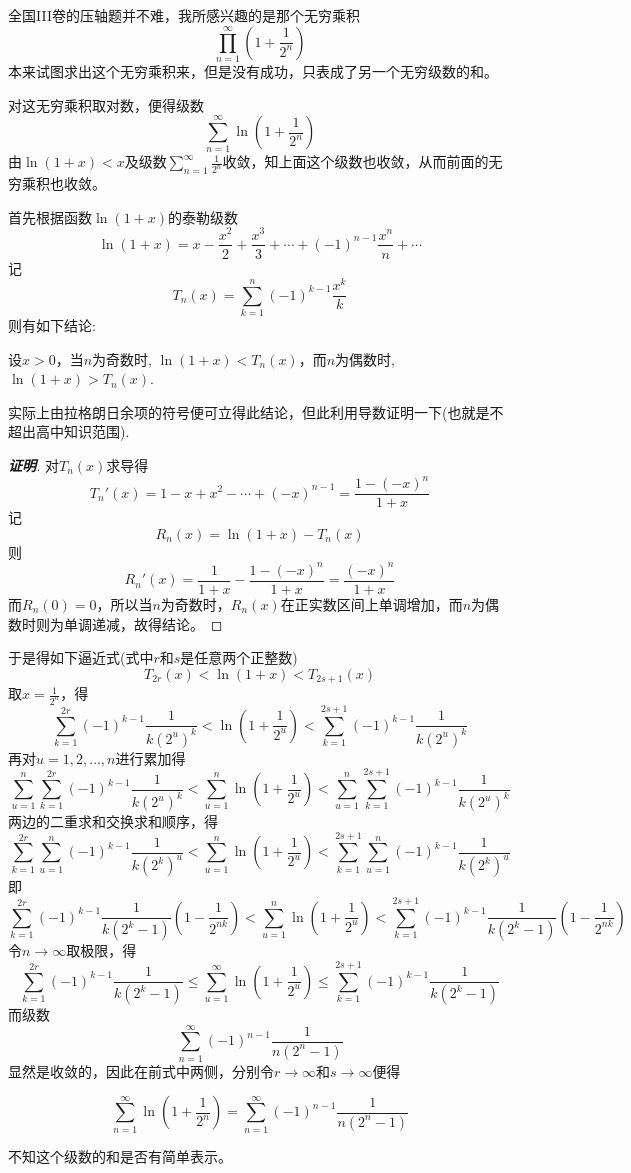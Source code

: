 \documentclass{ctexart}
\begin{document}
全国III卷的压轴题并不难，我所感兴趣的是那个无穷乘积
\[ \prod_{n=1}^{\infty}\left( 1+\frac{1}{2^n} \right) \]
本来试图求出这个无穷乘积来，但是没有成功，只表成了另一个无穷级数的和。

对这无穷乘积取对数，便得级数
\[ \sum_{n=1}^{\infty} \ln{ \left( 1+\frac{1}{2^n} \right) } \]
由$\ln(1+x)<x$及级数$\sum_{n=1}^{\infty} \frac{1}{2^n}$收敛，知上面这个级数也收敛，从而前面的无穷乘积也收敛。

首先根据函数$\ln{(1+x)}$的泰勒级数
\[ \ln{(1+x)} = x-\frac{x^2}{2}+\frac{x^3}{3}+\cdots + (-1)^{n-1} \frac{x^n}{n}  + \cdots \]
记
\[ T_n(x) = \sum_{k=1}^n (-1)^{k-1}\frac{x^k}{k} \]
则有如下结论:
\begin{statement}
  设$x>0$，当$n$为奇数时, $\ln{(1+x)} < T_n(x)$，而$n$为偶数时, $\ln{(1+x)}>T_n(x)$.
\end{statement}
实际上由拉格朗日余项的符号便可立得此结论，但此利用导数证明一下(也就是不超出高中知识范围).
\begin{proof}[\textbf{证明}]
  对$T_n(x)$求导得
  \[ T_n'(x) = 1-x+x^2-\cdots + (-x)^{n-1} = \frac{1-(-x)^n}{1+x} \]
  记
  \[ R_n(x) = \ln{(1+x)}-T_n(x) \]
  则
  \[ R_n'(x) = \frac{1}{1+x} - \frac{1-(-x)^n}{1+x} = \frac{(-x)^n}{1+x} \]
  而$R_n(0)=0$，所以当$n$为奇数时，$R_n(x)$在正实数区间上单调增加，而$n$为偶数时则为单调递减，故得结论。
\end{proof}

于是得如下逼近式(式中$r$和$s$是任意两个正整数)
\[ T_{2r}(x) < \ln{(1+x)} < T_{2s+1}(x) \]
取$x=\frac{1}{2^u}$，得
\[ \sum_{k=1}^{2r} (-1)^{k-1} \frac{1}{k(2^u)^k} < \ln{\left( 1+\frac{1}{2^u} \right) < \sum_{k=1}^{2s+1} (-1)^{k-1} \frac{1}{k(2^u)^k}} \]
再对$u=1,2,\ldots,n$进行累加得
\[ \sum_{u=1}^n \sum_{k=1}^{2r} (-1)^{k-1} \frac{1}{k(2^u)^k} < \sum_{u=1}^n \ln{\left( 1+\frac{1}{2^u} \right) < \sum_{u=1}^{n} \sum_{k=1}^{2s+1} (-1)^{k-1} \frac{1}{k(2^u)^k}} \]
两边的二重求和交换求和顺序，得
\[  \sum_{k=1}^{2r} \sum_{u=1}^n (-1)^{k-1} \frac{1}{k(2^k)^u} < \sum_{u=1}^n \ln{\left( 1+\frac{1}{2^u} \right) <  \sum_{k=1}^{2s+1} \sum_{u=1}^{n}(-1)^{k-1} \frac{1}{k(2^k)^u}} \]
即
\[ \sum_{k=1}^{2r} (-1)^{k-1} \frac{1}{k(2^k-1)} \left( 1-\frac{1}{2^{nk}} \right) < \sum_{u=1}^n \ln{\left( 1+\frac{1}{2^u} \right)} < \sum_{k=1}^{2s+1} (-1)^{k-1} \frac{1}{k(2^k-1)} \left( 1-\frac{1}{2^{nk}} \right)\]
令$n\to\infty$取极限，得
\[ \sum_{k=1}^{2r} (-1)^{k-1} \frac{1}{k(2^k-1)} \leqslant \sum_{u=1}^{\infty} \ln{\left( 1+\frac{1}{2^u} \right)} \leqslant \sum_{k=1}^{2s+1} (-1)^{k-1} \frac{1}{k(2^k-1)} \]
而级数
\[ \sum_{n=1}^{\infty} (-1)^{n-1} \frac{1}{n(2^n-1)} \]
显然是收敛的，因此在前式中两侧，分别令$r \to \infty$和$s \to \infty$便得
\begin{statement}
\[ \sum_{n=1}^{\infty} \ln{\left( 1+\frac{1}{2^n} \right)} = \sum_{n=1}^{\infty} (-1)^{n-1} \frac{1}{n(2^n-1)} \]
\end{statement}
不知这个级数的和是否有简单表示。
\end{document}

